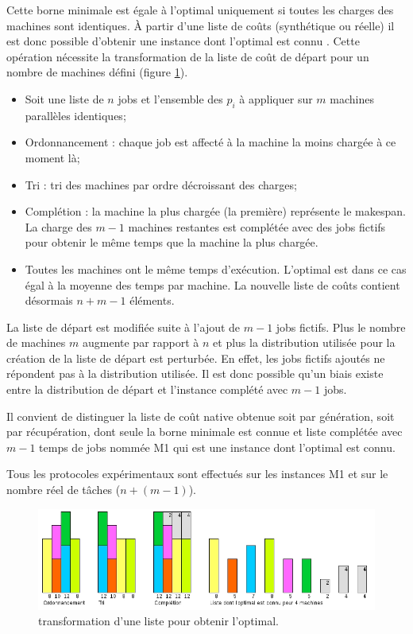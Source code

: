 \documentclass[a4paper,12pt]{report}
\theoremstyle{plain}				%
\theoremstyle{definition}				%
\newcommand{\lp}[1]{\todo[author=LP,color=yellow,inline]{#1}}
\newcommand{\jb}[1]{\todo[author=JB,color=orange,inline]{#1}}
\begin{document}
Cette borne minimale est égale à l'optimal uniquement si toutes les char\-ges des machines sont identiques.
À partir d'une liste de coûts (synthétique ou réelle) il est donc possible d'obtenir une instance dont l'optimal est connu \cite{benoit2021update}. Cette opération nécessite la transformation de la liste de coût de départ pour un nombre de machines défini (figure \ref{ex:maitriseOptimal}).
\begin{itemize}
	\item Soit une liste de $n$ jobs et l'ensemble des $p_i$ à appliquer sur $m$ machines parallèles identiques;
	\item Ordonnancement : chaque job est affecté à la machine la moins chargée à ce moment là;
	\item Tri : tri des machines par ordre décroissant des charges;
	\item Complétion : la machine la plus chargée (la première) représente le makespan. 
	La charge des $m-1$ machines restantes est complétée avec des jobs fictifs pour obtenir 
	le même temps que la machine la plus chargée.
	\item Toutes les machines ont le même temps d'exécution. L'optimal est dans ce cas égal à la 
	      moyenne des temps par machine. 
	      La nouvelle liste de coûts contient désormais $n + m-1$ éléments.
\end{itemize}

La liste de départ est modifiée suite à l'ajout de $m-1$ jobs fictifs. 
Plus le nombre de machines $m$ augmente par rapport à $n$ et plus la distribution utilisée pour 
  la création de la liste de départ est perturbée. 
En effet, les jobs fictifs ajoutés ne répondent pas à la distribution utilisée. 
Il est donc possible qu'un biais existe entre la distribution de départ et l'instance complété avec $m-1$ jobs.

 
Il convient de distinguer la liste de coût native obtenue 
  soit par génération, 
  soit par récupération, 
  dont seule la borne minimale est connue  
  et liste complétée avec $m-1$ temps de jobs nommée M1 qui est une instance dont l'optimal est connu.
  
Tous les protocoles expérimentaux sont effectués sur les instances M1 et sur le nombre réel de 
  tâches ($n + (m-1)$).

\begin{figure}
{\centering
\includegraphics[width=\columnwidth]{maitriseOptimal.jpg}
\caption{transformation d'une liste pour obtenir l'optimal.}
\label{ex:maitriseOptimal}
\par}
\end{figure}
\end{document}

